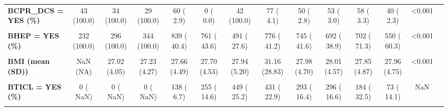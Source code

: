 \documentclass[
]{article}
\begin{document}
\begin{table}[H]
\begin{tabular}[t]{>{\raggedright\arraybackslash}p{5em}ccccccccccccc}
\textbf{BCPR\_DCS = YES (\%)} & 43 (100.0) & 34 (100.0) & 29 (100.0) & 60 (  2.9) & 0 (  0.0) & 42 (100.0) & 77 (  4.1) & 50 (  2.8) & 53 (  3.0) & 58 (  3.3) & 40 (  2.3) & <0.001 & \\
\textbf{\cellcolor{gray!10}{BECG = YES (\%)}} & \cellcolor{gray!10}{0 (  NaN)} & \cellcolor{gray!10}{0 (  NaN)} & \cellcolor{gray!10}{0 (  NaN)} & \cellcolor{gray!10}{705 (100.0)} & \cellcolor{gray!10}{1511 ( 86.5)} & \cellcolor{gray!10}{0 (  NaN)} & \cellcolor{gray!10}{1792 ( 95.1)} & \cellcolor{gray!10}{1680 ( 93.8)} & \cellcolor{gray!10}{1661 (100.0)} & \cellcolor{gray!10}{1219 ( 94.1)} & \cellcolor{gray!10}{1085 ( 86.7)} & \cellcolor{gray!10}{NaN} & \cellcolor{gray!10}{}\\
\textbf{BHEP = YES (\%)} & 232 (100.0) & 296 (100.0) & 344 (100.0) & 839 ( 40.4) & 761 ( 43.6) & 491 ( 27.6) & 776 ( 41.2) & 745 ( 41.6) & 692 ( 38.9) & 702 ( 71.3) & 550 ( 60.3) & <0.001 & \\
\textbf{\cellcolor{gray!10}{BILIVALL = YES (\%)}} & \cellcolor{gray!10}{0 (  NaN)} & \cellcolor{gray!10}{0 (  NaN)} & \cellcolor{gray!10}{0 (  NaN)} & \cellcolor{gray!10}{80 (  3.9)} & \cellcolor{gray!10}{92 (  5.3)} & \cellcolor{gray!10}{106 (  6.0)} & \cellcolor{gray!10}{136 (  7.2)} & \cellcolor{gray!10}{44 (  2.5)} & \cellcolor{gray!10}{3 (  0.2)} & \cellcolor{gray!10}{57 (  3.3)} & \cellcolor{gray!10}{54 (  3.1)} & \cellcolor{gray!10}{NaN} & \cellcolor{gray!10}{}\\
\textbf{BMI (mean (SD))} & NaN (NA) & 27.02 (4.05) & 27.23 (4.27) & 27.66 (4.49) & 27.70 (4.53) & 27.94 (5.20) & 31.16 (28.83) & 27.98 (4.70) & 28.01 (4.57) & 27.85 (4.87) & 27.96 (4.75) & <0.001 & \\
\textbf{\cellcolor{gray!10}{BNAR = YES (\%)}} & \cellcolor{gray!10}{0 (  NaN)} & \cellcolor{gray!10}{0 (  NaN)} & \cellcolor{gray!10}{0 (  NaN)} & \cellcolor{gray!10}{220 (100.0)} & \cellcolor{gray!10}{358 ( 20.5)} & \cellcolor{gray!10}{197 ( 11.1)} & \cellcolor{gray!10}{278 ( 14.7)} & \cellcolor{gray!10}{0 (  NaN)} & \cellcolor{gray!10}{0 (  NaN)} & \cellcolor{gray!10}{0 (  NaN)} & \cellcolor{gray!10}{0 (  NaN)} & \cellcolor{gray!10}{NaN} & \cellcolor{gray!10}{}\\
\textbf{BTICL = YES (\%)} & 0 (  NaN) & 0 (  NaN) & 0 (  NaN) & 138 (  6.7) & 255 ( 14.6) & 449 ( 25.2) & 431 ( 22.9) & 293 ( 16.4) & 296 ( 16.6) & 184 ( 32.5) & 73 ( 14.1) & NaN & \\
\textbf{\cellcolor{gray!10}{BTIMI (mean (SD))}} & \cellcolor{gray!10}{NaN (NA)} & \cellcolor{gray!10}{NaN (NA)} & \cellcolor{gray!10}{NaN (NA)} & \cellcolor{gray!10}{NaN (NA)} & \cellcolor{gray!10}{0.89 (1.15)} & \cellcolor{gray!10}{0.80 (1.11)} & \cellcolor{gray!10}{0.94 (1.24)} & \cellcolor{gray!10}{0.82 (1.16)} & \cellcolor{gray!10}{1.04 (1.25)} & \cellcolor{gray!10}{1.12 (1.22)} & \cellcolor{gray!10}{0.85 (1.13)} & \cellcolor{gray!10}{<0.001} & \cellcolor{gray!10}{}\\

\end{tabular}
\end{table}
\end{document}
